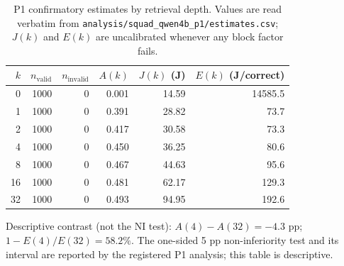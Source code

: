 \begin{table}[t]
\centering
\caption{P1 confirmatory estimates by retrieval depth. Values are read verbatim from \texttt{analysis/squad\_qwen4b\_p1/estimates.csv}; $J(k)$ and $E(k)$ are uncalibrated whenever any block factor fails.}
\label{tab:p1_estimates}
\small
\setlength{\tabcolsep}{4pt}
\begin{tabular}{rrrrrr}
\toprule
$k$ & $n_{\mathrm{valid}}$ & $n_{\mathrm{invalid}}$ & $A(k)$ & $J(k)$ (J) & $E(k)$ (J/correct) \\
\midrule
0 & 1000 & 0 & 0.001 & 14.59 & 14585.5 \\
1 & 1000 & 0 & 0.391 & 28.82 & 73.7 \\
2 & 1000 & 0 & 0.417 & 30.58 & 73.3 \\
4 & 1000 & 0 & 0.450 & 36.25 & 80.6 \\
8 & 1000 & 0 & 0.467 & 44.63 & 95.6 \\
16 & 1000 & 0 & 0.481 & 62.17 & 129.3 \\
32 & 1000 & 0 & 0.493 & 94.95 & 192.6 \\
\bottomrule
\end{tabular}
\par\vspace{2pt}
\begin{flushleft}
\footnotesize
Descriptive contrast (not the NI test): $A(4)-A(32)=-4.3$ pp; $1-E(4)/E(32)=58.2\%$.
The one-sided 5 pp non-inferiority test and its interval are reported by the registered P1 analysis; this table is descriptive.
\end{flushleft}
\end{table}
